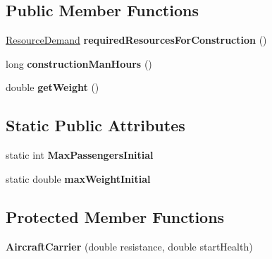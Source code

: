 \subsection*{Public Member Functions}
\begin{DoxyCompactItemize}
\item 
\hyperlink{classuniverse_1_1_resource_demand}{Resource\+Demand} {\bfseries required\+Resources\+For\+Construction} ()\hypertarget{classtools_1_1vehicles_1_1sea_1_1_aircraft_carrier_a809f16101ee08cd12baa1975d5ffde15}{}\label{classtools_1_1vehicles_1_1sea_1_1_aircraft_carrier_a809f16101ee08cd12baa1975d5ffde15}

\item 
long {\bfseries construction\+Man\+Hours} ()\hypertarget{classtools_1_1vehicles_1_1sea_1_1_aircraft_carrier_af4c4e613c79a0bed861e7863f89f004f}{}\label{classtools_1_1vehicles_1_1sea_1_1_aircraft_carrier_af4c4e613c79a0bed861e7863f89f004f}

\item 
double {\bfseries get\+Weight} ()\hypertarget{classtools_1_1vehicles_1_1sea_1_1_aircraft_carrier_ab37931cc36a7745b9fec5df82106dcaf}{}\label{classtools_1_1vehicles_1_1sea_1_1_aircraft_carrier_ab37931cc36a7745b9fec5df82106dcaf}

\end{DoxyCompactItemize}
\subsection*{Static Public Attributes}
\begin{DoxyCompactItemize}
\item 
static int {\bfseries Max\+Passengers\+Initial}\hypertarget{classtools_1_1vehicles_1_1sea_1_1_aircraft_carrier_ae8424c5d21cdc347093512b94dddffbf}{}\label{classtools_1_1vehicles_1_1sea_1_1_aircraft_carrier_ae8424c5d21cdc347093512b94dddffbf}

\item 
static double {\bfseries max\+Weight\+Initial}\hypertarget{classtools_1_1vehicles_1_1sea_1_1_aircraft_carrier_a68e1c9cb9d8d562cddc86e465b5b552f}{}\label{classtools_1_1vehicles_1_1sea_1_1_aircraft_carrier_a68e1c9cb9d8d562cddc86e465b5b552f}

\end{DoxyCompactItemize}
\subsection*{Protected Member Functions}
\begin{DoxyCompactItemize}
\item 
{\bfseries Aircraft\+Carrier} (double resistance, double start\+Health)\hypertarget{classtools_1_1vehicles_1_1sea_1_1_aircraft_carrier_a447f6275c5ce1b96adbab42c92c0e512}{}\label{classtools_1_1vehicles_1_1sea_1_1_aircraft_carrier_a447f6275c5ce1b96adbab42c92c0e512}

\end{DoxyCompactItemize}
